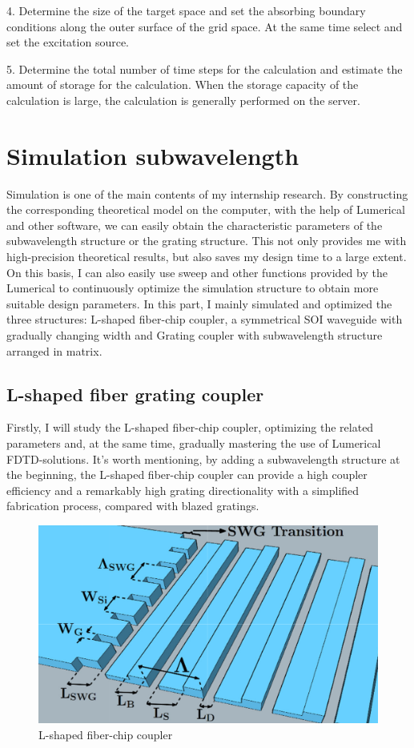 \documentclass[]{article}
\begin{document}
4. Determine the size of the target space and set the absorbing boundary conditions along the outer surface of the grid space. At the same time select and set the excitation source.

5. Determine the total number of time steps for the calculation and estimate the amount of storage for the calculation. When the storage capacity of the calculation is large, the calculation is generally performed on the server.

\section{Simulation subwavelength}
Simulation is one of the main contents of my internship research. By constructing the corresponding theoretical model on the computer, with the help of Lumerical and other software, we can easily obtain the characteristic parameters of the subwavelength structure or the grating structure. This not only provides me with high-precision theoretical results, but also saves my design time to a large extent. On this basis, I can also easily use sweep and other functions provided by the Lumerical to continuously optimize the simulation structure to obtain more suitable design parameters. In this part, I mainly simulated and optimized the three structures: L-shaped fiber-chip coupler, a symmetrical SOI waveguide with gradually changing width and Grating coupler with subwavelength structure arranged in matrix.

\subsection{L-shaped fiber grating coupler}
Firstly, I will study the L-shaped fiber-chip coupler, optimizing the related parameters and, at the same time, gradually mastering the use of Lumerical FDTD-solutions. It's worth mentioning, by adding a subwavelength structure at the beginning, the L-shaped fiber-chip coupler can provide a high coupler efficiency and a remarkably high grating directionality with a simplified fabrication process, compared with blazed gratings.



\begin{figure}[H]
	\centering
	\includegraphics[width=0.7\linewidth]{figures/figure1}
	\caption{L-shaped fiber-chip coupler}
	\label{fig:figure1}
\end{figure}
\end{document}
